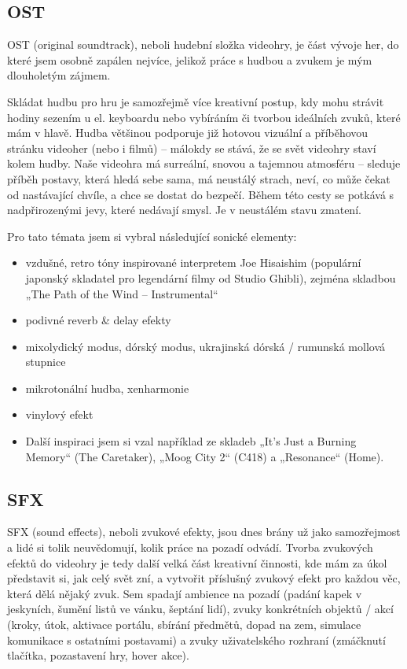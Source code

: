 \subsection{OST}

OST (original soundtrack), neboli hudební složka videohry, je část vývoje her, do které jsem osobně zapálen nejvíce, jelikož práce s hudbou a zvukem je mým dlouholetým zájmem.

Skládat hudbu pro hru je samozřejmě více kreativní postup, kdy mohu strávit hodiny sezením u el. keyboardu nebo vybíráním či tvorbou ideálních zvuků, které mám v hlavě. Hudba většinou podporuje již hotovou vizuální a příběhovou stránku videoher (nebo i filmů) – málokdy se stává, že se svět videohry staví kolem hudby. Naše videohra má surreální, snovou a tajemnou atmosféru – sleduje příběh postavy, která hledá sebe sama, má neustálý strach, neví, co může čekat od nastávající chvíle, a chce se dostat do bezpečí. Během této cesty se potkává s nadpřirozenými jevy, které nedávají smysl. Je v neustálém stavu zmatení.

Pro tato témata jsem si vybral následující sonické elementy:

\begin{itemize}
    \item vzdušné, retro tóny inspirované interpretem Joe Hisaishim (populární japonský skladatel pro legendární filmy od Studio Ghibli), zejména skladbou „The Path of the Wind – Instrumental“
    \item podivné reverb \& delay efekty
    \item mixolydický modus, dórský modus, ukrajinská dórská / rumunská mollová stupnice
    \item mikrotonální hudba, xenharmonie
    \item vinylový efekt
    \item Další inspiraci jsem si vzal například ze skladeb „It’s Just a Burning Memory“ (The Caretaker), „Moog City 2“ (C418) a „Resonance“ (Home).
\end{itemize}

\subsection{SFX}
SFX (sound effects), neboli zvukové efekty, jsou dnes brány už jako samozřejmost a lidé si tolik neuvědomují, kolik práce na pozadí odvádí. Tvorba zvukových efektů do videohry je tedy další velká část kreativní činnosti, kde mám za úkol představit si, jak celý svět zní, a vytvořit příslušný zvukový efekt pro každou věc, která dělá nějaký zvuk. Sem spadají ambience na pozadí (padání kapek v jeskyních, šumění listů ve vánku, šeptání lidí), zvuky konkrétních objektů / akcí (kroky, útok, aktivace portálu, sbírání předmětů, dopad na zem, simulace komunikace s ostatními postavami) a zvuky uživatelského rozhraní (zmáčknutí tlačítka, pozastavení hry, hover akce).

